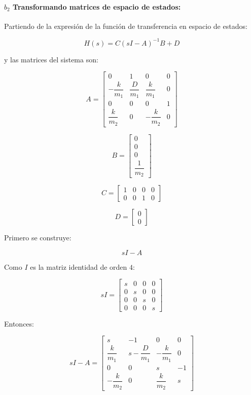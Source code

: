 \documentclass[a4paper]{article}
\begin{document}
\paragraph{$b_2$ Transformando matrices de espacio de estados:}

Partiendo de la expresión de la función de transferencia en espacio de estados:

\[
H(s)=C(sI-A)^{-1}B+D
\]


y las matrices del sistema son:

\[
A=
\begin{bmatrix}
	0 & 1 & 0 & 0\\
	-\dfrac{k}{m_1} & \dfrac{D}{m_1} & \dfrac{k}{m_1} & 0\\
	0 & 0 & 0 & 1\\
	\dfrac{k}{m_2} & 0 & -\dfrac{k}{m_2} & 0
\end{bmatrix}
\]

\[
B=
\begin{bmatrix}
	0\\
	0\\
	0\\
	\dfrac{1}{m_2}
\end{bmatrix}
\]

\[
C=
\begin{bmatrix}
	1 & 0 & 0 & 0\\
	0 & 0 & 1 & 0
\end{bmatrix}
\]

\[
D=
\begin{bmatrix}
	0\\
	0
\end{bmatrix}
\]

Primero se construye:

\[
sI-A
\]

Como \(I\) es la matriz identidad de orden \(4\):

\[
sI=
\begin{bmatrix}
	s & 0 & 0 & 0\\
	0 & s & 0 & 0\\
	0 & 0 & s & 0\\
	0 & 0 & 0 & s
\end{bmatrix}
\]

Entonces:

\[
sI-A=
\begin{bmatrix}
	s & -1 & 0 & 0\\
	\dfrac{k}{m_1} & s-\dfrac{D}{m_1} & -\dfrac{k}{m_1} & 0\\
	0 & 0 & s & -1\\
	-\dfrac{k}{m_2} & 0 & \dfrac{k}{m_2} & s
\end{bmatrix}
\]
\end{document}
